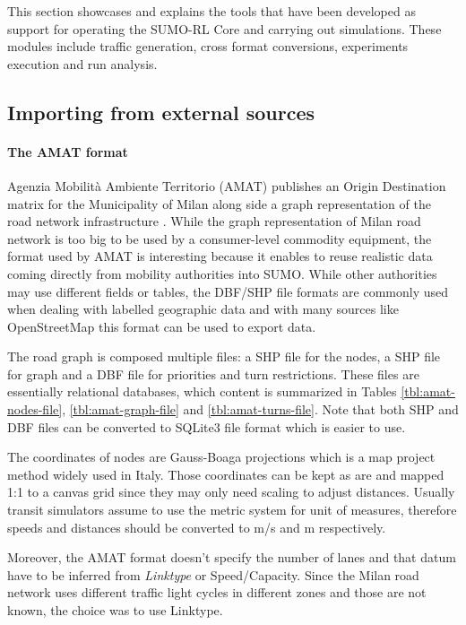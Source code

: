 This section showcases and explains the tools that have been developed as support for operating the SUMO-RL Core and carrying out simulations.
These modules include traffic generation, cross format conversions, experiments execution and run analysis.

\subsection{Importing from external sources}

\paragraph{The AMAT format}

Agenzia Mobilit\`a Ambiente Territorio (AMAT) publishes an Origin Destination matrix for the Municipality of Milan along side a graph representation of the road network infrastructure \cite{ODMilano2010}.
While the graph representation of Milan road network is too big to be used by a consumer-level commodity equipment, the format used by AMAT is interesting because it enables to reuse realistic data coming directly from mobility authorities into SUMO.
While other authorities may use different fields or tables, the DBF/SHP file formats are commonly used when dealing with labelled geographic data and with many sources like OpenStreetMap this format can be used to export data.

The road graph is composed multiple files: a SHP file for the nodes, a SHP file for graph and a DBF file for priorities and turn restrictions.
These files are essentially relational databases, which content is summarized in Tables \ref{tbl:amat-nodes-file}, \ref{tbl:amat-graph-file} and \ref{tbl:amat-turns-file}.
Note that both SHP and DBF files can be converted to SQLite3 file format which is easier to use.

The coordinates of nodes are Gauss-Boaga projections which is a map project method widely used in Italy. Those coordinates can be kept as are and mapped 1:1 to a canvas grid since they may only need scaling to adjust distances.
Usually transit simulators assume to use the metric system for unit of measures, therefore speeds and distances should be converted to m/s and m respectively.

Moreover, the AMAT format doesn't specify the number of lanes and that datum have to be inferred from \textit{Linktype} or Speed/Capacity.
Since the Milan road network uses different traffic light cycles in different zones and those are not known, the choice was to use Linktype.


